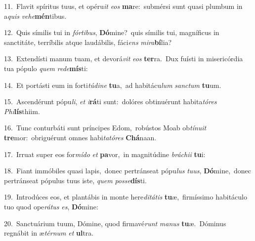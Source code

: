 {\numbfont\textcolor{\numbcolor}{11.}}~Flavit spíritus tuus, et opéru\textit{it} \textit{e}\-\textit{os} \textbf{ma}\-re:~\star submérsi sunt quasi plumbum in a\textit{quis} \textit{ve}\-\textit{he}\textbf{mén}tibus.\par
{\numbfont\textcolor{\numbcolor}{12.}}~Quis símilis tui in \textit{fór}\-\textit{ti}\textit{bus}, \textbf{Dó}\-mine?~\star quis símilis tui, magníficus in sanctitáte, terríbilis atque laudábilis, fáci\textit{ens} \textit{mi}\-\textit{ra}\textbf{bí}lia?\par
{\numbfont\textcolor{\numbcolor}{13.}}~Extendísti manum tuam, et devorá\textit{vit} \textit{e}\-\textit{os} \textbf{ter}\-ra.~\star Dux fuísti in misericórdia tua pópulo \textit{quem} \textit{red}\-\textit{e}\textbf{mís}ti:\par
{\numbfont\textcolor{\numbcolor}{14.}}~Et portásti eum in forti\-\textit{tú}\-\textit{di}\textit{ne} \textbf{tu}\-a,~\star ad habitácu\textit{lum} \textit{sanc}\-\textit{tum} \textbf{tu}\-um.\par
{\numbfont\textcolor{\numbcolor}{15.}}~Ascendérunt pópu\-\textit{li}\-, \textit{et} \textit{i}\-\textbf{rá}ti sunt:~\star dolóres obtinuérunt habita\-\textit{tó}\-\textit{res} \textit{Phi}\-\textbf{lís}thiim.\par
{\numbfont\textcolor{\numbcolor}{16.}}~Tunc conturbáti sunt príncipes Edom,~\dagger robústos Moab ob\-\textit{tí}\-\textit{nu}\textit{it} \textbf{tre}\-mor:~\star obriguérunt omnes habi\-\textit{ta}\-\textit{tó}\textit{res} \textbf{Chá}\-naan.\par
{\numbfont\textcolor{\numbcolor}{17.}}~Irruat super eos for\-\textit{mí}\-\textit{do} \textit{et} \textbf{pa}\-vor,~\star in magnitúdine \textit{brá}\-\textit{chi}\textit{i} \textbf{tu}\-i:\par
{\numbfont\textcolor{\numbcolor}{18.}}~Fiant immóbiles quasi lapis,~\dagger donec pertránseat pópu\textit{lus} \textit{tu}\-\textit{us}, \textbf{Dó}\-mine,~\star donec pertránseat pópulus tuus iste, \textit{quem} \textit{pos}\-\textit{se}\textbf{dís}ti.\par
{\numbfont\textcolor{\numbcolor}{19.}}~Introdúces eos, et plantábis in monte here\-\textit{di}\-\textit{tá}\textit{tis} \textbf{tu}\-æ,~\star firmíssimo habitáculo tuo quod ope\-\textit{rá}\-\textit{tus} \textit{es}\-, \textbf{Dó}\-mine:\par
{\numbfont\textcolor{\numbcolor}{20.}}~Sanctuárium tuum, Dómine, quod firmavé\textit{runt} \textit{ma}\-\textit{nus} \textbf{tu}\-æ.~\star Dóminus regnábit in æ\-\textit{tér}\-\textit{num} \textit{et} \textbf{ul}\-tra.\par
